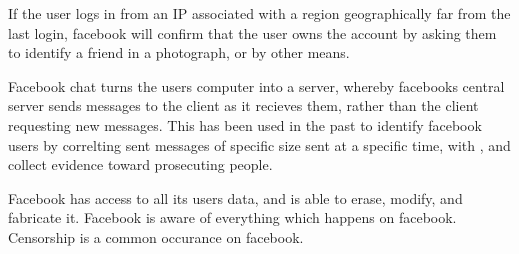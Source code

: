 If the user logs in from an IP associated with a region geographically far from
the last login, facebook will confirm that the user owns the account by asking
them to identify a friend in a photograph, or by other means.

Facebook chat turns the users computer into a server, whereby facebooks central
server sends messages to the client as it recieves them, rather than the client
requesting new messages. This has been used in the past to identify facebook
users by correlting sent messages of specific size sent at a specific time, with
, and collect evidence toward prosecuting people. 

Facebook has access to all its users data, and is able to erase, modify, and
fabricate it. Facebook is aware of everything which happens on facebook.
Censorship is a common occurance on facebook.
